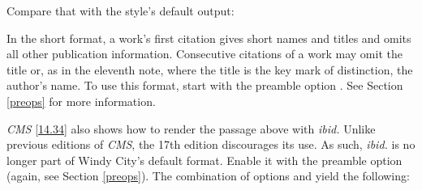 \documentclass[11pt,letterpaper,oneside]{article}
\begin{document}
Compare that with the style's default output:

\begin{citeonly}
\item \cite[3]{morrison2004a}
\item \cite[18]{morrison2004a}
\item \cite[18]{morrison2004a}
\item \cite[24--26]{morrison2004a}
\item \cite[401-2]{morrison2004b}
\item \cite[433]{morrison2004b}
\item \cite[37--38]{diaz2008}
\item \cite[403]{morrison2004b}
\item \cite[152]{diaz2008}
\item \cite[201-2]{diaz2008}
\item \cites[240]{morrison2004b}[32]{morrison2004a}
\item \cite[33]{morrison2004a}
\end{citeonly}

\noindent In the short format, a work's first citation gives short
names and titles and omits all other publication information.
Consecutive citations of a work may omit the title or, as in the
eleventh note, where the title is the key mark of distinction, the
author's name. To use this format, start \biblatex with the preamble
option . See Section \ref{preops} for more information.

\textit{CMS} \ref{14.34} also shows how to render the passage above
with \textit{ibid.} Unlike previous editions of \textit{CMS}, the 17th
edition discourages its use. As such, \textit{ibid.} is no longer part
of Windy City's default format. Enable it with the preamble option
 (again, see Section \ref{preops}). The combination of
options  and  yield the following:
\end{document}
